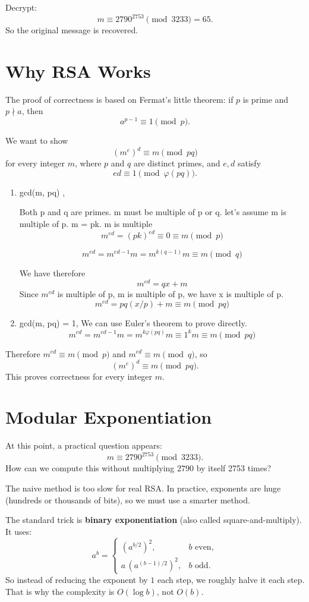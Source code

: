 Decrypt:
\[
  m \equiv 2790^{2753} \pmod{3233} = 65.
\]
So the original message is recovered.

\section{Why RSA Works}
The proof of correctness is based on Fermat's little theorem:
if \(p\) is prime and \(p\nmid a\), then
\[
  a^{p-1}\equiv 1 \pmod p.
\]

We want to show
\[
  (m^e)^d \equiv m \pmod{pq}
\]
for every integer \(m\), where \(p\) and \(q\) are distinct primes, and \(e,d\)
satisfy
\[
  ed \equiv 1 \pmod{\varphi(pq)}.
\]


\begin{enumerate}
  \item gcd(m, pq) , 

  Both p and q are primes. m must be multiple of p or q. let's assume m is multiple of p. m = pk. m is multiple
  \[
    m^{ed}
    =(pk)^{ed}
    \equiv 0 
    \equiv m \pmod p
  \]

  \[
    m^{ed}
    =m^{ed-1}m
    =m^{k(q-1)}m
    \equiv m \pmod q
  \]

  We have therefore
  \[
    m^{ed}=qx+m
  \]
  Since $m^{ed}$ is multiple of p, m is multiple of p, we have x is multiple of p.
  \[
    m^{ed}=pq(x/p)+m
    \equiv m \pmod {pq}
  \]

  \item gcd(m, pq) = 1, 
  We can use Euler's theorem to prove directly.
  \[
    m^{ed}
    =m^{ed-1}m
    =m^{k\varphi(pq)}m
    \equiv 1^k m
    \equiv m
    \pmod {pq}
  \]
\end{enumerate}

Therefore \(m^{ed}\equiv m\pmod p\) and \(m^{ed}\equiv m\pmod q\), so
\[
  (m^e)^d \equiv m \pmod{pq}.
\]
This proves correctness for every integer \(m\).

\section{Modular Exponentiation}
At this point, a practical question appears:
\[
  m \equiv 2790^{2753} \pmod{3233}.
\]
How can we compute this without multiplying \(2790\) by itself 2753 times?

The naive method is too slow for real RSA. In practice, exponents are huge
(hundreds or thousands of bits), so we must use a smarter method.

The standard trick is \textbf{binary exponentiation} (also called
square-and-multiply). It uses:
\[
  a^b=
  \begin{cases}
    (a^{b/2})^2, & b \text{ even},\\[2mm]
    a\,(a^{(b-1)/2})^2, & b \text{ odd}.
  \end{cases}
\]
So instead of reducing the exponent by \(1\) each step, we roughly halve it
each step. That is why the complexity is \(O(\log b)\), not \(O(b)\).

